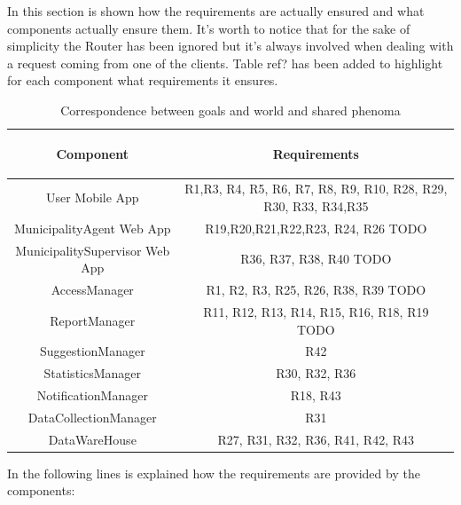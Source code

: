 \documentclass[a4paper]{report}
\begin{document}
In this section is shown how the requirements are actually ensured and what components actually ensure them. It's worth to notice that for the sake of simplicity the Router has been ignored but it's always involved when dealing with a request coming from one of the clients. 
Table ref? has been added to highlight for each component what requirements it ensures.
\begin{table}[H]  
  \centering
  \begin{tabular}{|c|c|}
    \cline{1-2}
   	\rule{0pt}{10pt} 
   	\begin{large}
    \textbf{Component} 
    \end{large}&\begin{large}
    \textbf{Requirements} 
    \end{large}\\  \hline
    User Mobile App &  R1,R3, R4, R5, R6, R7, R8, R9, R10, R28, R29, R30, R33, R34,R35\\ \hline
    MunicipalityAgent Web App & R19,R20,R21,R22,R23, R24, R26 TODO \\ \hline
    MunicipalitySupervisor Web App & R36, R37, R38, R40 TODO \\ \hline
    AccessManager & R1, R2, R3, R25, R26, R38, R39 TODO \\ \hline
    ReportManager & R11, R12, R13, R14, R15, R16, R18, R19 TODO \\ \hline
    SuggestionManager & R42 \\ \hline
    StatisticsManager & R30, R32, R36 \\ \hline
    NotificationManager & R18, R43 \\ \hline
    DataCollectionManager & R31 \\ \hline
    DataWareHouse & R27, R31, R32, R36, R41, R42, R43 \\ \hline
    
  \end{tabular}
  \caption{Correspondence between goals and world and shared phenoma}
\end{table}
In the following lines is explained how the requirements are provided by the components:
\end{document}
